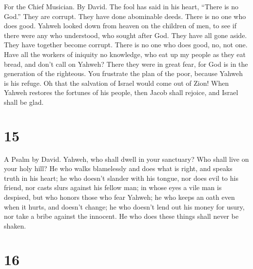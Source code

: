 For the Chief Musician. By David.  The fool has said in
his heart, ``There is no God.'' They are corrupt. They have done
abominable deeds. There is no one who does good.  Yahweh
looked down from heaven on the children of men, to see if there were any
who understood, who sought after God.  They have all gone
aside. They have together become corrupt. There is no one who does good,
no, not one.  Have all the workers of iniquity no
knowledge, who eat up my people as they eat bread, and don't call on
Yahweh?  There they were in great fear, for God is in the
generation of the righteous.  You frustrate the plan of
the poor, because Yahweh is his refuge.  Oh that the
salvation of Israel would come out of Zion! When Yahweh restores the
fortunes of his people, then Jacob shall rejoice, and Israel shall be
glad.

\hypertarget{section-14}{%
\section{15}\label{section-14}}

A Psalm by David.  Yahweh, who shall dwell in your
sanctuary? Who shall live on your holy hill?  He who walks
blamelessly and does what is right, and speaks truth in his heart;
 he who doesn't slander with his tongue, nor does evil to
his friend, nor casts slurs against his fellow man;  in
whose eyes a vile man is despised, but who honors those who fear Yahweh;
he who keeps an oath even when it hurts, and doesn't change;
 he who doesn't lend out his money for usury, nor take a
bribe against the innocent. He who does these things shall never be
shaken.

\hypertarget{section-15}{%
\section{16}\label{section-15}}

